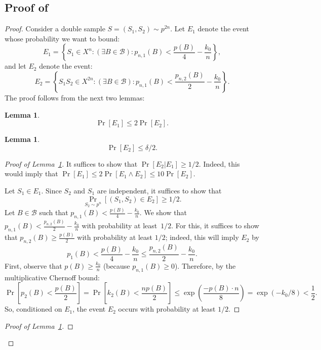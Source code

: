 \documentclass{article}
\def\B{{\mathcal B}}
\newcommand{\samp}{S}
\newtheorem{lemma}[theorem]{Lemma}
\begin{document}
\subsection{Proof of }\label{sec:auxuc}
\begin{proof}
Consider a double sample $S=(\samp_1,\samp_2)\sim p^{2n}$.
Let $E_1$ denote the event whose probability we want to bound:
\[
E_1 = \left\{S_1\in X^n : (\exists B\in\B): p_{n,1}(B) < \frac{p(B)}{4} - \frac{k_0}{n} \right\},
\]
and let $E_2$ denote the event:
\[
E_2 = \left\{S_1S_2\in X^{2n} : (\exists B\in\B): p_{n,1}(B) < \frac{p_{n,2}(B)}{2} - \frac{k_0}{n} \right\}.
\]
The proof follows from the next two lemmas:
\begin{lemma}\label{lem:auxuc1}
\[\Pr[E_1]\leq 2\Pr[E_2].\]
\end{lemma}
\begin{lemma}\label{lem:auxuc2}
\[\Pr[E_2]\leq \delta/2.\]
\end{lemma}
\begin{proof}[Proof of Lemma~\ref{lem:auxuc1}]
It suffices to show that $\Pr[E_2 \vert E_1]\geq 1/2$.
Indeed, this would imply that 
$\Pr[E_1] \leq 2\Pr[E_1 \land E_2]\leq 10\Pr[E_2]$.

Let $S_1\in E_1$. Since $S_2$ and $S_1$ are independent,
it suffices to show that 
\[\Pr_{S_2\sim p^n}\left[(S_1,S_2)\in E_2\right] \geq 1/2.\]
Let $B\in\B$ such that $p_{n,1}(B)< \frac{p(B)}{4} - \frac{k_0}{n}$.
We show that $p_{n,1}(B) < \frac{p_{n,2}(B)}{2} - \frac{k_0}{n}$ with probability at least~$1/2$.
For this, it suffices to show that $p_{n,2}(B)\geq \frac{p(B)}{2}$ with probability at least $1/2$;
indeed, this will imply $E_2$ by
\[p_1(B) < \frac{p(B)}{4}- \frac{k_0}{n} \leq  \frac{p_{n,2}(B)}{2}- \frac{k_0}{n}.\]
First, observe that $p(B) \geq \frac{k_0}{n}$ (because $p_{n,1}(B) \geq 0$).
Therefore, by the multiplicative Chernoff bound:
\[
\Pr\left[ p_2(B) < \frac{p(B)}{2}\right]
=
\Pr\left[ k_2(B) < \frac{np(B)}{2}\right]
\leq
\exp\left( \frac{-p(B)\cdot n}{8}\right) = \exp(-k_0/8)< \frac{1}{2}.
\]
So, conditioned on $E_1$, 
the event $E_2$ occurs with probability at least $1/2$.


\end{proof}

\begin{proof}[Proof of Lemma~\ref{lem:auxuc2}]


\end{proof}
\end{proof}
\end{document}
